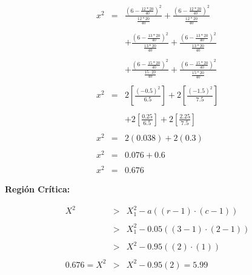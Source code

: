 \documentclass{article}
\begin{document}
		\begin{equation*}
			\begin{array}{rcl}
			x^2 & = & \displaystyle \frac{\left(6 - \frac{12 * 20}{40}\right)^2}{\displaystyle \frac{12 * 20}{40}} + \displaystyle \frac{\left(6 - \frac{12 * 20}{40}\right)^2}{\displaystyle \frac{12 * 20}{40}}
			\\
			\\
			&  & + \displaystyle \frac{\left(6 - \displaystyle \frac{13 * 20}{40}\right)^2}{\displaystyle \frac{13 * 20}{40}} + \displaystyle \frac{\left(6 -  \displaystyle \frac{13 * 20}{40}\right)^2}{\displaystyle \frac{13 * 20}{40}}
			\\
			\\
			& & + \displaystyle \frac{ \displaystyle \left(6 - \frac{15 * 20}{40}\right)^2}{ \displaystyle \frac{15 \cdot 20}{40}} + \displaystyle \frac{ \displaystyle \left(6 - \frac{15 * 20}{40}\right)^2}{\displaystyle \frac{15 * 20}{40}}
			\\
			\\
			x^2 & = & 2\left[\frac{\left(-0.5\right)^2}{6.5}\right] + 2\left[\frac{\left(-1.5\right)^2}{7.5}\right]
			\\
			\\
			 & & + 2\left[\frac{0.25}{6.5}\right] + 2\left[\frac{2.25}{7.5}\right]
			\\
			\\
			x^2 & = & 2\left(0.038\right) + 2\left(0.3\right)
			\\
			\\
			x^2 & = & 0.076 + 0.6
			\\
			\\
			 x^2 & = & 0.676
			\end{array}
		\end{equation*}
		
		\begin{flushleft}
			\textbf{Regi\'on Cr\'itica:}
		\end{flushleft}
		
		\begin{equation*}    
		\begin{array}{rcl}
		X^2 & > & X_{1}^{2} - a \left(\left(r-1\right)\cdot \left(c-1\right)\right)\\\\
		 & > & X_{1}^{2} - 0.05 \left(\left(3-1\right)\cdot \left(2-1\right)\right)\\\\
		 & > & X^{2} - 0.95 \left(\left(2\right)\cdot \left(1\right)\right)\\\\
		0.676 = X^2 & > & X^{2} - 0.95 \left(2\right) = 5.99\\
		\end{array}
		\end{equation*}
		
\end{document}
